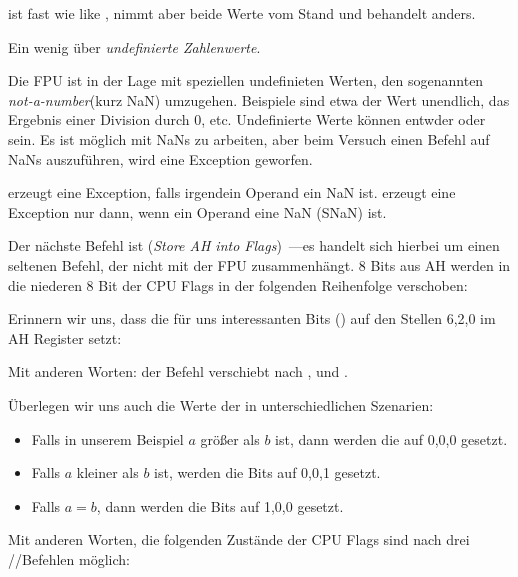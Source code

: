 


\FUCOMPP{} ist fast wie like \FCOM, nimmt aber beide Werte vom Stand und
behandelt  anders.


Ein wenig über \emph{undefinierte Zahlenwerte}.

Die FPU ist in der Lage mit speziellen undefinieten Werten, den sogenannten
\emph{not-a-number}(kurz \gls{NaN}) umzugehen. Beispiele sind etwa der Wert
unendlich, das Ergebnis einer Division durch 0, etc. Undefinierte Werte können
entwder  oder  sein. Es ist möglich mit  NaNs zu
arbeiten, aber beim Versuch einen Befehl auf  NaNs auszuführen,
wird eine Exception geworfen. 

\FCOM erzeugt eine Exception, falls irgendein Operand ein \gls{NaN} ist.
\FUCOM erzeugt eine Exception nur dann, wenn ein Operand eine 
\gls{NaN} (SNaN) ist.

\label{SAHF}
Der nächste Befehl ist \SAHF (\emph{Store AH into Flags})~---es handelt sich
hierbei um einen seltenen Befehl, der nicht mit der FPU zusammenhängt.
8 Bits aus AH werden in die niederen 8 Bit der CPU Flags in der folgenden
Reihenfolge verschoben:



Erinnern wir uns, dass \FNSTSW die für uns interessanten Bits (\CThreeBits) auf
den Stellen 6,2,0 im AH Register setzt:


Mit anderen Worten: der Befehl  verschiebt \CThreeBits
nach \ZF, \PF und \CF. 

Überlegen wir uns auch die Werte der \CThreeBits in unterschiedlichen Szenarien:

\begin{itemize} 
  \item Falls in unserem Beispiel $a$ größer als $b$ ist, dann werden die
  \CThreeBits auf 0,0,0 gesetzt.
  \item Falls $a$ kleiner als $b$ ist, werden die Bits auf 0,0,1 gesetzt.
  \item Falls $a=b$, dann werden die Bits auf 1,0,0 gesetzt.
\end{itemize}
Mit anderen Worten, die folgenden Zustände der CPU Flags sind nach drei
\FUCOMPP/\FNSTSW/\SAHF Befehlen möglich:


